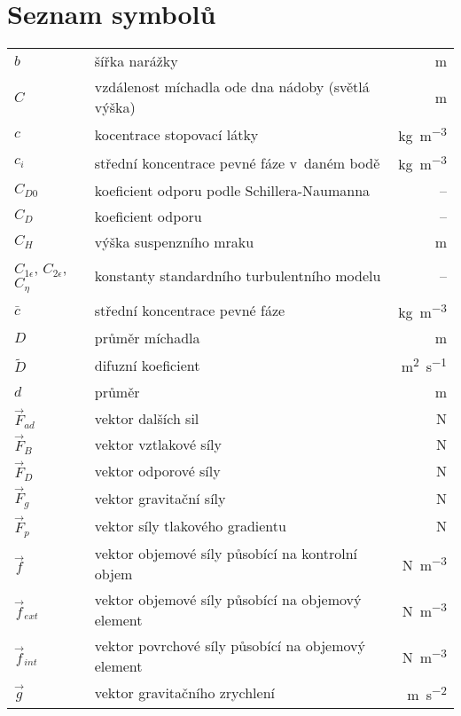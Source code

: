 \chapter*{Seznam symbolů}

\renewcommand\arraystretch{1.5}
\begin{tabularx}{\textwidth}{@{}p{2.5cm} X r@{}}

$b$ & šířka narážky & \si{\meter} \\
$C$ & vzdálenost míchadla ode dna nádoby (světlá výška) & \si{\meter} \\
$c$ & kocentrace stopovací látky & \si{\kilogram\per\cubic\meter} \\
$c_{i}$ & střední koncentrace pevné fáze v~daném bodě & \si{\kilogram\per\cubic\meter} \\
$C_{D0}$ & koeficient odporu podle Schillera-Naumanna & -- \\ 
$C_{D}$ & koeficient odporu &  -- \\
$C_{H}$ & výška suspenzního mraku & \si{\meter} \\
$C_{1\epsilon}$, $C_{2\epsilon}$, $C_{\eta}$ & konstanty standardního \keps{} turbulentního modelu & -- \\
$\bar{c}$ & střední koncentrace pevné fáze & \si{\kilogram\per\cubic\meter} \\
$D$ & průměr míchadla & \si{\meter} \\
$\tilde{D}$ & difuzní koeficient & \si{\meter\squared\per\second} \\
$d$ & průměr & \si{\meter} \\
$\vec{F}_{ad}$ & vektor dalších sil & \si{\newton} \\
$\vec{F}_{B}$ & vektor vztlakové síly & \si{\newton} \\
$\vec{F}_{D}$ & vektor odporové síly & \si{\newton} \\
$\vec{F}_{g}$ & vektor gravitační síly & \si{\newton} \\
$\vec{F}_{p}$ & vektor síly tlakového gradientu & \si{\newton} \\
$\vec{f}$ & vektor objemové síly působící na kontrolní objem & \si{\newton\per\cubic\meter} \\
$\vec{f}_{ext}$ & vektor objemové síly působící na objemový element & \si{\newton\per\cubic\meter} \\
$\vec{f}_{int}$ & vektor povrchové síly působící na objemový element & \si{\newton\per\cubic\meter} \\
$\vec{g}$ & vektor gravitačního zrychlení & \si{\meter\per\second\squared} \\

\end{tabularx}
